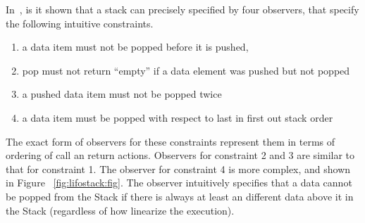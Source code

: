 In~\cite{BEEH:icalp15}, is it shown that
a stack can precisely specified by four observers,
that specify the following intuitive constraints.
\begin{enumerate}
\item a data item must not be popped before it is pushed,
\item pop must not return ``empty'' if a data element was pushed but not
  popped
\item a pushed data item must not be popped twice
\item a data item must be popped with respect to last in first out stack order%
\end{enumerate}
The exact form of observers for these constraints represent them in
terms of ordering of call an return actions. Observers for constraint
2 and 3 are similar to that for constraint 1. The observer for constraint
4 is more complex, and shown in Figure ~\ref{fig:lifostack:fig}. The observer intuitively specifies that a data cannot be popped from the Stack if there is always at least an different data above it in the Stack (regardless of how linearize the execution).
